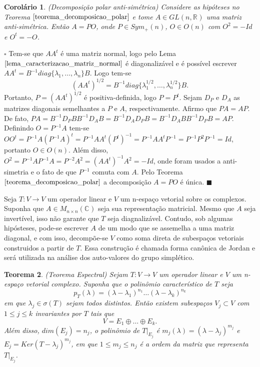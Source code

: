 \documentclass[12pt]{book}
\newtheorem{teorema}{Teorema}[section]
\newtheorem{corolario}[teorema]{Corolário}
\newenvironment{prova}[1]{$\square$ #1}{\hfill$\blacksquare$}
\newcommand{\complexo}[1]{\mathbb{C}^{#1}}
\newcommand{\generalgroup}[2]{GL(#1, #2)}
\newcommand{\generalgroupreal}[1]{\generalgroup{#1}{\real{}}}
\newcommand{\matrizortogonal}[1]{O(#1)}
\newcommand{\matrizquadcomplexa}[1]{M_{#1 \times #1}(\complexo{})}
\newcommand{\matrizsimetricapositiva}[1]{Sym_{+}(#1)}
\newcommand{\real}[1]{\mathbb{R}^{#1}}
\begin{document}
	\begin{corolario}\label{corolario_decomposicao_matriz_antisimetrica}
		(Decomposição polar anti-simétrica) Considere as hipóteses no Teorema $\ref{teorema_decomposicao_polar}$ e tome $A \in \generalgroupreal{n}$ uma matriz anti-simétrica. Então $A = PO$, onde $P \in \matrizsimetricapositiva{n}$, $O \in \matrizortogonal{n}$ com  $O^{2} = -Id$ e $O^{t} = -O$.
	\end{corolario}
	\begin{prova}
		Tem-se que $AA^{t}$ é uma matriz normal, logo pelo Lema $\ref{lema_caracterizacao_matriz_normal}$ é diagonalizável e é possível escrever $AA^{t} = B^{-1}diag\{\lambda_{1}, \dots, \lambda_{n}\}B$. Logo tem-se 
		$$
		(AA^{t})^{1/2} =B^{-1}diag\{\lambda_{1}^{1/2}, \dots, \lambda_{n}^{1/2}\}B.
		$$
		Portanto, $P=(AA^{t})^{1/2}$ é positiva-definida, logo $P=P^{t}$. Sejam $D_{P}$ e $D_{A}$ as matrizes diagonais semelhantes a $P$ e $A$, respectivamente. Afirmo que $PA = AP$. De fato, $PA = B^{-1}D_{P}B B^{-1}D_{A}B = B^{-1}D_{A} D_{P}B = B^{-1}D_{A}B B^{-1}D_{P}B = AP$. Definindo $O = P^{-1}A$ tem-se $OO^{t} = P^{-1}A(P^{-1}A)^{t} = P^{-1}AA^{t}(P^{t})^{-1} = P^{-1}AA^{t}P^{-1} = P^{-1}P^{2}P^{-1}  = Id$, portanto $O \in \matrizortogonal{n}$. Além disso, $O^{2} = P^{-1}AP^{-1}A = P^{-2}A^{2} = (AA^{t})^{-1}A^{2} = -Id$, onde foram usados a anti-simetria e o fato de que $P^{-1}$ comuta com $A$. Pelo Teorema $\ref{teorema_decomposicao_polar}$ a decomposição $A=PO$ é única.
	\end{prova}
	
	Seja $T:V\to V$ um operador linear e $V$ um n-espaço vetorial sobre os complexos. Suponha que $A \in \matrizquadcomplexa{n}$ seja sua representação matricial. Mesmo que $A$ seja invertível, isso não garante que $T$ seja diagnalizável. Contudo, sob algumas hipósteses, pode-se escrever $A$ de um modo que se assemelha a uma matriz diagonal, e com isso, decompõe-se $V$ como soma direta de subespaços vetoriais construidos a partir de $T$. Essa construção é chamada forma canônica de Jordan e será utilizada na análise dos auto-valores do grupo simplético.
	
	\begin{teorema}\label{teorema_espectral_jordan}
		(Teorema Espectral) Sejam $T:V \to V$ um operador linear e $V$ um n-espaço vetorial complexo. Suponha que o polinômio característico de $T$ seja
		$$
		p_{T}(\lambda) = (\lambda - \lambda_{1})^{n_{1}}\dots (\lambda - \lambda_{k})^{n_{k}}
		$$
		em que $\lambda_{j} \in \sigma(T)$ sejam todos distintos. Então existem subespaços $V_{j} \subset V$ com $1\leq j \leq k$ invariantes por $T$ tais que 
		$$
		V = E_{1}\oplus \dots \oplus E_{k}.
		$$
		Além disso, $dim(E_{j}) = n_{j}$,  o polinômio de $T|_{E_{j}}$ é $m_{j}(\lambda) = (\lambda - \lambda_{j})^{m_{j}}$ e $E_{j} = Ker(T-\lambda_{j})^{m_{j}}$, em que $1\leq m_{j}\leq n_{j}$ é a ordem da matriz que representa $T|_{E_{j}}$.
	\end{teorema}
	
\end{document}
